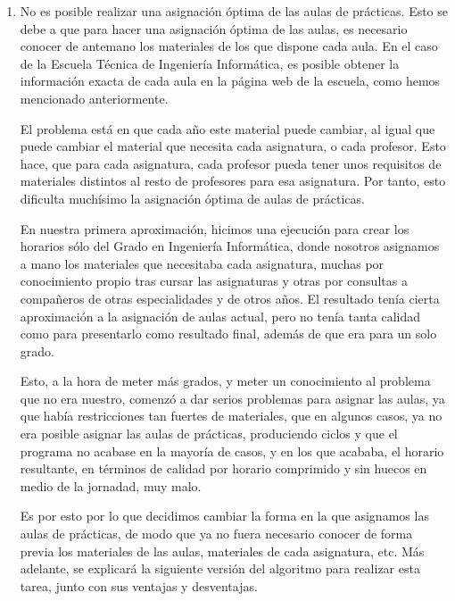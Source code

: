 \begin{enumerate}[---]
    \item No es posible realizar una asignación óptima de las aulas de prácticas. Esto se debe a que para hacer una asignación óptima de las aulas, es necesario conocer de antemano los materiales de los que dispone cada aula. En el caso de la Escuela Técnica de Ingeniería Informática, es posible obtener la información exacta de cada aula en la página web de la escuela, como hemos mencionado anteriormente.

    El problema está en que cada año este material puede cambiar, al igual que puede cambiar el material que necesita cada asignatura, o cada profesor. Esto hace, que para cada asignatura, cada profesor pueda tener unos requisitos de materiales distintos al resto de profesores para esa asignatura. Por tanto, esto dificulta muchísimo la asignación óptima de aulas de prácticas.

    En nuestra primera aproximación, hicimos una ejecución para crear los horarios sólo del Grado en Ingeniería Informática, donde nosotros asignamos a mano los materiales que necesitaba cada asignatura, muchas por conocimiento propio tras cursar las asignaturas y otras por consultas a compañeros de otras especialidades y de otros años. El resultado tenía cierta aproximación a la asignación de aulas actual, pero no tenía tanta calidad como para presentarlo como resultado final, además de que era para un solo grado. 

    Esto, a la hora de meter más grados, y meter un conocimiento al problema que no era nuestro, comenzó a dar serios problemas para asignar las aulas, ya que había restricciones tan fuertes de materiales, que en algunos casos, ya no era posible asignar las aulas de prácticas, produciendo ciclos y que el programa no acabase en la mayoría de casos, y en los que acababa, el horario resultante, en términos de calidad por horario comprimido y sin huecos en medio de la jornadad, muy malo. 

    Es por esto por lo que decidimos cambiar la forma en la que asignamos las aulas de prácticas, de modo que ya no fuera necesario conocer de forma previa los materiales de las aulas, materiales de cada asignatura, etc. Más adelante, se explicará la siguiente versión del algoritmo para realizar esta tarea, junto con sus ventajas y desventajas.

\end{enumerate}
